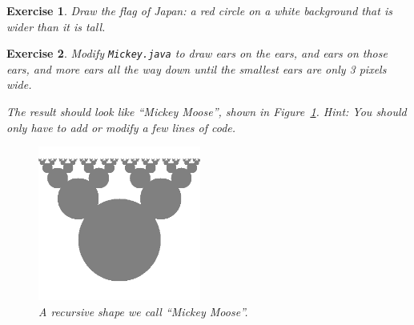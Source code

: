 \documentclass[12pt]{book}
\theoremstyle{exercise}
\newtheorem{exercise}{Exercise}[chapter]
\begin{document}
\begin{exercise}
Draw the flag of Japan: a red circle on a white background that is wider than it is tall.
\end{exercise}


\begin{exercise}
Modify {\tt Mickey.java} to draw ears on the ears, and ears on those ears, and more ears all the way down until the smallest ears are only 3 pixels wide.

The result should look like ``Mickey Moose'', shown in Figure~\ref{fig.moose}.
{\em Hint:} You should only have to add or modify a few lines of code.

\begin{figure}[!ht]
\begin{center}
\includegraphics[height=2in]{figs/moose.png}
\caption{A recursive shape we call ``Mickey Moose''.}
\label{fig.moose}
\end{center}
\end{figure}

\end{exercise}
\end{document}
